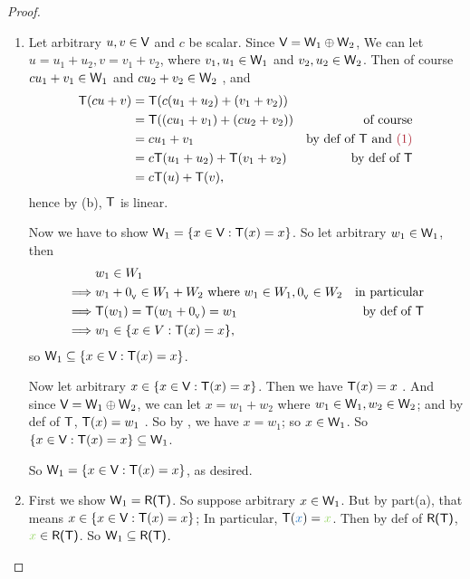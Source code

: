 \begin{proof} \ 
\begin{enumerate}
\item
Let arbitrary \(u, v \in \textsf{V}\) and \(c\) be scalar.
Since \(\textsf{V} = \textsf{W}_1 \oplus \textsf{W}_2\), We can let \(u = u_1 + u_2, v = v_1 + v_2\), where \(v_1, u_1 \in \textsf{W}_1\) and \(v_2, u_2 \in \textsf{W}_2\).
Then of course \(c u_1 + v_1 \in \textsf{W}_1\) and \(c u_2 + v_2 \in \textsf{W}_2\) \MAROON{(1)}, and
\begin{align*}
    \T(cu + v) & = \T(c(u_1 + u_2) + (v_1 + v_2)) \\
               & = \T((c u_1 + v_1) + (c u_2 + v_2)) & \text{of course} \\
               & = c u_1 + v_1 & \text{by def of \(\T\) and \MAROON{(1)}} \\
               & = c \T(u_1 + u_2) + \T(v_1 + v_2) & \text{by def of \(\T\)} \\
               & = c \T(u) + \T(v),
\end{align*}
hence by (b), \(\textsf{T}\) is linear.

Now we have to show \(\textsf{W}_1 = \{ x \in \textsf{V} : \textsf{T}(x) = x \}\).
So let arbitrary \(w_1 \in \textsf{W}_1\), then
\begin{align*}
             & w_1 \in W_1 \\
    \implies & w_1 + 0_{_{\textsf{V}}} \in W_1 + W_2 \text{ where } w_1 \in W_1, 0_{_{\textsf{V}}} \in W_2 & \text{in particular} \\
    \implies & \textsf{T}(w_1) = \textsf{T}(w_1 + 0_{_{\textsf{V}}}) = w_1 & \text{by def of \(\textsf{T}\)} \\
    \implies & w_1 \in \{ x \in V : \textsf{T}(x) = x \},
\end{align*}
so \(\textsf{W}_1 \subseteq \{ x \in \textsf{V} : \textsf{T}(x) = x \}\).

Now let arbitrary \(x \in \{ x \in \textsf{V} : \textsf{T}(x) = x \}\).
Then we have \(\textsf{T}(x) = x\) .
And since \(\textsf{V} = \textsf{W}_1 \oplus \textsf{W}_2\), we can let \(x = w_1 + w_2\) where \(w_1 \in \textsf{W}_1, w_2 \in \textsf{W}_2\);
and by def of \(\textsf{T}\), \(\textsf{T}(x) = w_1\) \MAROON{(3)}.
So by , we have \(x = w_1\); so \(x \in \textsf{W}_1\).
So \(\{ x \in \textsf{V} : \textsf{T}(x) = x \} \subseteq \textsf{W}_1\).

So \(\textsf{W}_1 = \{ x \in \textsf{V} : \textsf{T}(x) = x\}\), as desired.

\item
First we show \(\textsf{W}_1 = \textsf{R(T)}\).
So suppose arbitrary \(x \in \textsf{W}_1\).
But by part(a), that means \(x \in \{x \in \textsf{V} : \textsf{T}(x) = x\}\);
In particular, \(\T(\BLUE{x}) = \GREEN{x}\).
Then by def of \(\textsf{R(T)}\), \(\GREEN{x} \in \RANGET\).
So \(\textsf{W}_1 \subseteq \textsf{R(T)}\).


\end{enumerate}
\end{proof}
